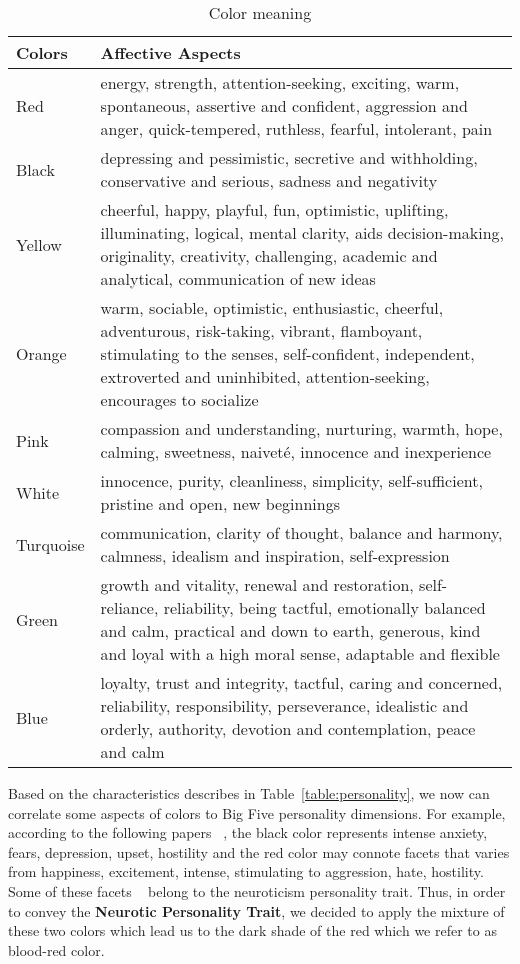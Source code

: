 \begin{table} [h]
\centering
\begin{tabular}{ | m{8em} | m{25em}| } 
\hline
\textbf{Colors} & \textbf{Affective Aspects}  \\
\hline
Red & energy, strength, attention-seeking, exciting, warm, spontaneous, assertive and confident,
aggression and anger, quick-tempered, ruthless, fearful, intolerant, pain  \\
\hline 
Black & depressing and pessimistic, secretive and withholding, conservative and serious,
sadness and negativity  \\
\hline 
Yellow & cheerful, happy, playful, fun, optimistic, uplifting, illuminating, logical, mental clarity,
aids decision-making, originality, creativity, challenging, academic and analytical, communication of new ideas   \\
\hline 
Orange & warm, sociable, optimistic, enthusiastic, cheerful, adventurous, risk-taking, vibrant,
flamboyant, stimulating to the senses,  self-confident, independent, extroverted and uninhibited,
attention-seeking, encourages to socialize  \\
\hline 
Pink & compassion and understanding, nurturing, warmth, hope, calming, sweetness,
naiveté, innocence and inexperience  \\
\hline
White & innocence, purity, cleanliness, simplicity, self-sufficient, pristine and open, new beginnings  \\
\hline
Turquoise &  communication, clarity of thought, balance and harmony, calmness,
idealism and inspiration, self-expression \\
\hline
Green & growth and vitality, renewal and restoration, self-reliance, reliability,
being tactful, emotionally balanced and calm, practical and down to earth, generous, kind and loyal
with a high moral sense, adaptable and flexible  \\
\hline
Blue &  loyalty, trust and integrity, tactful, caring and concerned, reliability, responsibility,
perseverance, idealistic and orderly, authority, devotion and contemplation, peace and calm \\
\hline
\end{tabular}
\caption{Color meaning}
\label{table:color}
\end{table}

Based on the characteristics describes in Table~\ref{table:personality},
we now can correlate some aspects of colors to Big Five personality dimensions.
For example, according to the following papers ~\cite{alschuler1943easel,schaie1961scaling},
the black color represents intense anxiety, fears, depression, upset, hostility and the red color may
connote facets that varies from happiness, excitement, intense, stimulating to aggression, hate, hostility.
Some of these facets ~\cite{costa1988catalog} belong to the neuroticism personality trait.
Thus, in order to convey the \textbf{Neurotic Personality Trait}, we decided to apply the
mixture of these two colors which lead us to the dark shade of the red which we refer to as blood-red color.

